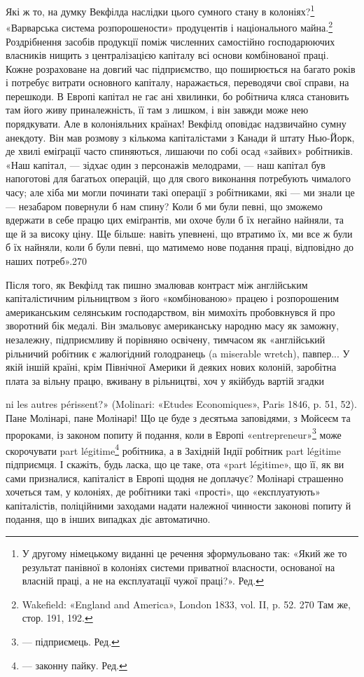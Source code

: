Які ж то, на думку Векфілда наслідки цього сумного стану в колоніях?\footnote*{
У другому німецькому виданні це речення зформульовано так: «Який же то результат панівної в
колоніях системи приватної власности, основаної на власній праці, а не на експлуатації чужої
праці?». Ред.
} «Варварська система
розпорошености» продуцентів і національного майна.\footnote{
Wakefield: «England and America», London 1833, vol. II, p. 52.
270 Там же, стор. 191, 192.
} Роздрібнення засобів
продукції поміж численних самостійно господарюючих власників нищить з централізацією капіталу всі
основи комбінованої праці. Кожне розраховане на довгий час підприємство, що поширюється на багато
років і потребує витрати основного капіталу, наражається, переводячи свої справи, на перешкоди. В
Европі капітал не гає ані хвилинки, бо робітнича кляса становить там його живу приналежність, її там
з лишком, і він завжди може нею порядкувати. Але в колоніяльних країнах! Векфілд
оповідає надзвичайно сумну анекдоту. Він мав розмову з кількома капіталістами з Канади й штату
Нью-Йорк, де хвилі еміґрації часто спиняються, лишаючи по собі осад «зайвих» робітників. «Наш
капітал, — зідхає один з персонажів мелодрами, — наш капітал був напоготові для багатьох операцій,
що для свого виконання потребують чималого часу; але хіба ми могли починати такі операції з
робітниками, які — ми знали це — незабаром повернули б нам спину? Коли б ми були певні, що зможемо
вдержати в себе працю цих еміґрантів, ми охоче були б їх негайно найняли, та ще й за високу ціну. Ще
більше: навіть упевнені, що втратимо їх, ми все ж були б їх найняли, коли б були певні, що матимемо
нове подання праці, відповідно до наших потреб».270

Після того, як Векфілд так пишно змалював контраст між англійським капіталістичним рільництвом з
його «комбінованою» працею і розпорошеним американським селянським господарством, він мимохіть
пробовкнувся й про зворотний бік
медалі. Він змальовує американську народню масу як заможну, незалежну, підприємливу й порівняно
освічену, тимчасом як «англійський рільничий робітник є жалюгідний голодранець (a miserable wretch),
павпер... У якій іншій країні, крім Північної Америки й деяких нових колоній, заробітна плата за
вільну працю, вживану в рільництві, хоч у якійбудь вартій згадки

ni les autres périssent?» (Molinari: «Etudes Economiques», Paris 1846, p. 51, 52). Пане Молінарі,
пане Молінарі! Що це буде з десятьма заповідями, з Мойсеєм та пророками, із законом попиту й
подання, коли в Европі «entrepreneur»\footnote*{
— підприємець. Ред.
} може скорочувати part légitime\footnote*{
— законну пайку. Ред.
} робітника, а в Західній
Індії робітник part légitime підприємця. І скажіть, будь ласка, що це таке, ота «part légitime», що
її, як ви сами призналися, капіталіст
в Европі щодня не доплачує? Молінарі страшенно хочеться там, у колоніях, де робітники такі «прості»,
що «експлуатують» капіталістів, поліційними заходами надати належної чинности законові попиту й
подання, що в інших випадках діє автоматично.